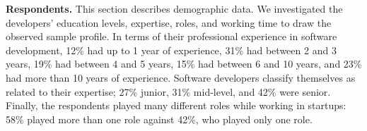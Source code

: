 \documentclass[runningheads]{llncs}
\begin{document}
\textbf{Respondents.} This section describes demographic data. We investigated the developers' education levels, expertise, roles, and working time to draw the observed sample profile. In terms of their professional experience in software development, 12\% had up to 1 year of experience, 31\% had between 2 and 3 years, 19\% had between 4 and 5 years, 15\% had between 6 and 10 years, and 23\% had more than 10 years of experience. Software developers classify themselves as related to their expertise; 27\% junior, 31\% mid-level, and 42\% were senior. Finally, the respondents played many different roles while working in startups: 58\% played more than one role against 42\%, who played only one role. %
{

}
\end{document}
